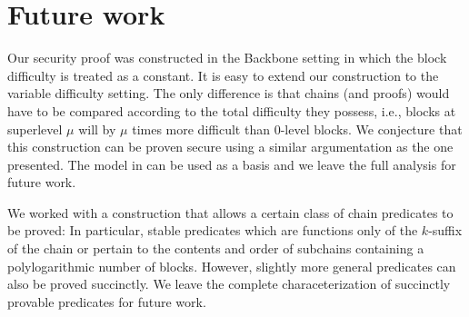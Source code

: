 \section{Future work}

Our security proof was constructed in the Backbone \cite{backbone} setting in
which the block difficulty is treated as a constant. 
It is easy to extend our construction to the variable difficulty setting. 
The only difference is that chains (and proofs) 
would have to be compared according to the total difficulty they possess, i.e., 
blocks at superlevel $\mu$ will by $\mu$ times more difficult
than $0$-level blocks. We conjecture
that this construction can be proven secure using a similar argumentation
as the one presented. The model in
\cite{backbone2} can be used as a basis and   we leave the full analysis  for
future work.

We worked with a construction that allows a certain class of chain predicates
to be proved: In particular, stable predicates which are functions only of the
$k$-suffix of the chain or pertain to the contents and order of subchains
containing a polylogarithmic number of blocks. However, slightly more general
predicates can also be proved succinctly. We leave the complete characeterization
of succinctly provable predicates for future work.
